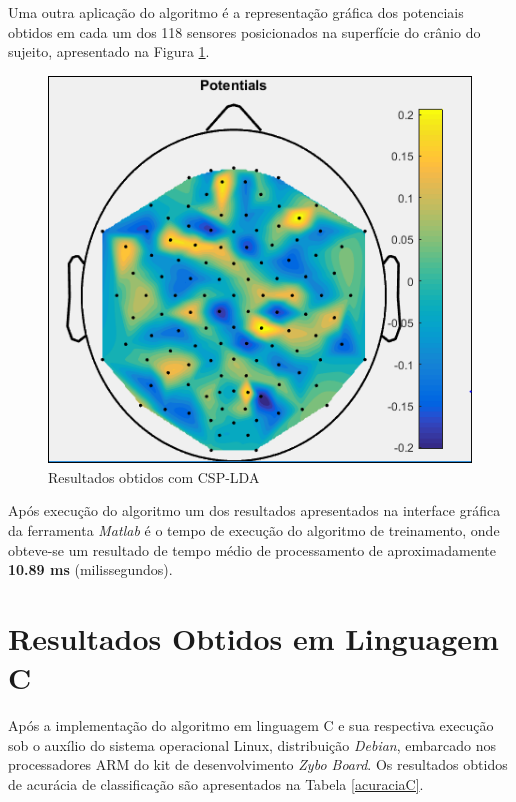 Uma outra aplicação do algoritmo é a representação gráfica dos potenciais obtidos em cada um dos 118 sensores posicionados na superfície do crânio do sujeito, apresentado na Figura \ref{resultadoLotte}.
\newpage
\begin{figure}[h]
	\centering
	\includegraphics[keepaspectratio=true,scale=0.45]{figuras/image_csp_matlab.PNG}
	\caption{Resultados obtidos  com CSP-LDA}
	\label{resultadoLotte}
\end{figure}

Após execução do algoritmo um dos resultados apresentados na interface gráfica da ferramenta \textit{Matlab} é o tempo de execução do algoritmo de treinamento, onde obteve-se um resultado de tempo médio de processamento de aproximadamente \textbf{10.89 ms} (milissegundos).

\section{Resultados Obtidos em Linguagem C}
Após a implementação do algoritmo em linguagem C e sua respectiva execução sob o auxílio do sistema operacional Linux, distribuição \textit{Debian}, embarcado nos processadores ARM do kit de desenvolvimento \textit{Zybo Board}. Os resultados obtidos de acurácia de classificação são apresentados na Tabela \ref{acuraciaC}.

